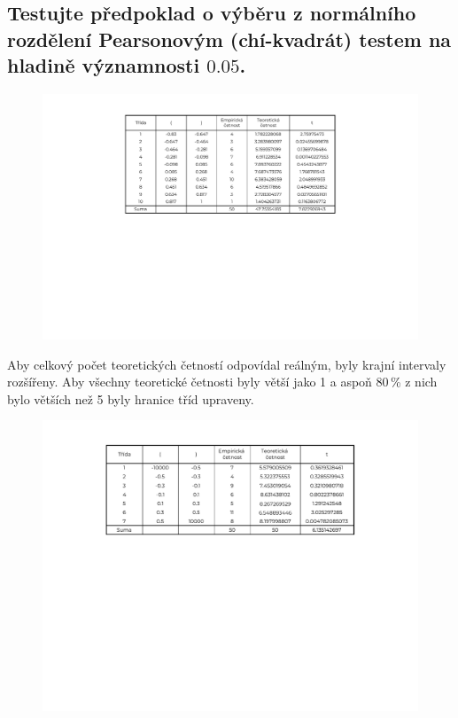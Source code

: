 \subsection{Testujte předpoklad o výběru z normálního rozdělení Pearsonovým (chí-kvadrát) testem na hladině významnosti $0.05$.}

\begin{figure}[H]
    \centering
    \includegraphics[width=1\linewidth]{1-d-1-crop.pdf}
\end{figure}

\begin{compactitem}
    \item Aby celkový počet teoretických četností odpovídal reálným, byly krajní intervaly rozšířeny. Aby všechny teoretické četnosti byly větší jako 1 a aspoň 80\,\% z nich bylo větších než 5 byly hranice tříd upraveny.
\end{compactitem}

\begin{figure}[H]
    \centering
    \includegraphics[width=1\linewidth]{1-d-2-crop.pdf}
\end{figure}


